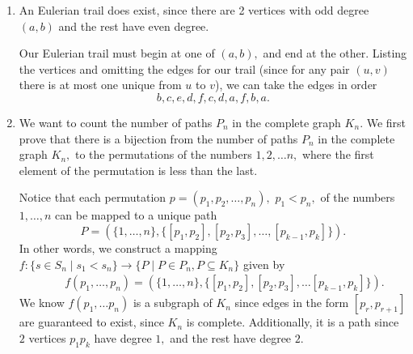 \documentclass{article}
\begin{document}
\begin{enumerate}
    \newpage
  \item An Eulerian trail does exist, since there are 2 vertices with
    odd degree $(a, b)$ and the rest have even degree.

    \begin{center}
    \end{center}
    Our Eulerian trail must begin at one of $(a, b),$ and end at the
    other. Listing the vertices and omitting the edges for our trail
    (since for any pair $(u, v)$ there is at most one unique from $u$
    to $v$), we can take the edges in order $$b, c, e, d, f, c, d, a, f, b, a.$$

  \item  We want to count the number of paths $P_n$  in the complete
    graph $K_n.$ We first prove that there is a bijection from the
    number of paths $P_n$ in the complete graph $K_n,$ to the
    permutations of the numbers $1,2, \ldots n,$ where the first
    element of the permutation is less than the last.

    Notice that each permutation $p = (p_1, p_2, \ldots, p_n),$ $p_1
    < p_n,$ of the numbers $1, \ldots, n$ can be mapped to a unique
    path $$P = (\{1, \ldots, n\}, \{[p_1, p_2], [p_2, p_3], \ldots,
    [p_{k-1}, p_k]\}).$$ In other words, we construct a mapping $f:
    \{s \in S_n \mid s_1 < s_n\} \rightarrow \{P \mid P \in P_n, P
    \subseteq K_n\}$ given by
    \begin{align*}
      \qquad f(p_1, \ldots, p_n) = (\{1, \ldots, n\}, \{[p_1, p_2],
      [p_2, p_3], \ldots [p_{k-1}, p_k]\}).
    \end{align*}
    We know $f(p_1, \ldots p_n)$ is a subgraph of $K_n$ since edges
    in the form $[p_r, p_{r + 1}]$ are guaranteed to exist, since
    $K_n$ is complete. Additionally, it is a path since $2$ vertices
    $p_1 p_k$ have degree $1,$ and the rest have degree $2.$


\end{enumerate}
\end{document}
